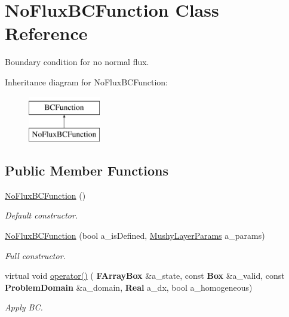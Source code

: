 \hypertarget{class_no_flux_b_c_function}{}\section{No\+Flux\+B\+C\+Function Class Reference}
\label{class_no_flux_b_c_function}


Boundary condition for no normal flux.  


Inheritance diagram for No\+Flux\+B\+C\+Function\+:\begin{figure}[H]
\begin{center}
\leavevmode
\includegraphics[height=2.000000cm]{class_no_flux_b_c_function}
\end{center}
\end{figure}
\subsection*{Public Member Functions}
\begin{DoxyCompactItemize}
\item 
\mbox{\label{class_no_flux_b_c_function_a6243d50e9672fb6869a40bdb1f335cf3}} 
\hyperlink{class_no_flux_b_c_function_a6243d50e9672fb6869a40bdb1f335cf3}{No\+Flux\+B\+C\+Function} ()
\begin{DoxyCompactList}\small\item\em Default constructor. \end{DoxyCompactList}\item 
\mbox{\label{class_no_flux_b_c_function_a966de8831cfb254ff72d255f060c3d43}} 
\hyperlink{class_no_flux_b_c_function_a966de8831cfb254ff72d255f060c3d43}{No\+Flux\+B\+C\+Function} (bool a\+\_\+is\+Defined, \hyperlink{class_mushy_layer_params}{Mushy\+Layer\+Params} a\+\_\+params)
\begin{DoxyCompactList}\small\item\em Full constructor. \end{DoxyCompactList}\item 
\mbox{\label{class_no_flux_b_c_function_a2ba95ac273b5afafd28a156fea4ae980}} 
virtual void \hyperlink{class_no_flux_b_c_function_a2ba95ac273b5afafd28a156fea4ae980}{operator()} (\textbf{ F\+Array\+Box} \&a\+\_\+state, const \textbf{ Box} \&a\+\_\+valid, const \textbf{ Problem\+Domain} \&a\+\_\+domain, \textbf{ Real} a\+\_\+dx, bool a\+\_\+homogeneous)
\begin{DoxyCompactList}\small\item\em Apply BC. \end{DoxyCompactList}\end{DoxyCompactItemize}
